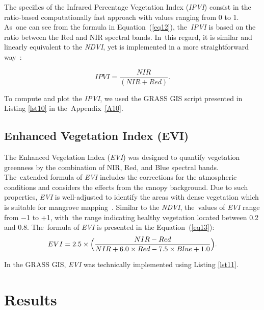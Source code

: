 \documentclass[jmse,article,accept,pdftex,moreauthors]{Definitions/mdpi}
\begin{document}
The specifics of the Infrared Percentage Vegetation Index (\emph{IPVI}) consist in the ratio-based computationally fast approach with values ranging from 0 to 1. As~one can see from the formula in Equation~(\ref{eq12}), the~\emph{IPVI} is based on the ratio between the Red and NIR spectral bands. In~this regard, it is similar and linearly equivalent to the \emph{NDVI}, yet is implemented in a more straightforward way~\cite{CRIPPEN199071}:

\begin{equation}\label{eq12}
	IPVI = \frac{NIR}{(NIR+Red)}.
\end{equation} 

To compute and plot the \emph{IPVI}, we used the GRASS GIS script presented in Listing \ref{lst10} in the~Appendix~\ref{A10}. 

\subsection{Enhanced Vegetation Index (EVI)}

The Enhanced Vegetation Index (\emph{EVI}) was designed to quantify vegetation greenness by the combination of NIR, Red, and Blue spectral bands. The~extended formula of \emph{EVI} includes the corrections for the atmospheric conditions and considers the effects from the canopy background. Due to such properties, \emph{EVI} is well-adjusted to identify the areas with dense vegetation which is suitable for mangrove mapping~\cite{HUETE2002195}. Similar to the \emph{NDVI}, the~values of \emph{EVI} range from $-$1 to +1, with~the range indicating healthy vegetation located between 0.2 and 0.8. The~formula of \emph{EVI} is presented in the Equation~(\ref{eq13}):
\begin{equation}\label{eq13}
EVI = 2.5 \times \Bigl(\frac{NIR - Red}{NIR + 6.0 \times Red - 7.5 \times Blue + 1.0}\Bigr).
\end{equation} 

In the GRASS GIS, \emph{EVI} was technically implemented using Listing \ref{lst11}.

\section{Results}
\end{document}

